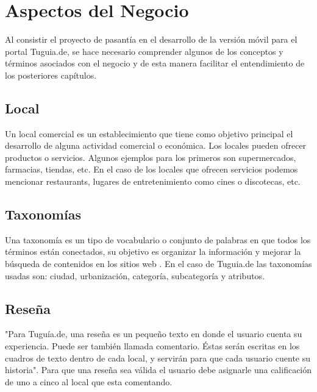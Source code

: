 \section{Aspectos del Negocio} \label{sect:aspectos_negocio}
  
Al consistir el proyecto de pasantía en el desarrollo de la versión móvil para el portal Tuguia.de, se hace necesario comprender algunos de los conceptos y términos asociados con el negocio y de esta manera facilitar el entendimiento de los posteriores capítulos.

\subsection{Local} \label{subsect:local}

Un local comercial es un establecimiento que tiene como objetivo principal el desarrollo de alguna actividad comercial o económica. Los locales pueden ofrecer productos o servicios. Algunos ejemplos para los primeros son supermercados, farmacias, tiendas, etc. En el caso de los locales que ofrecen servicios podemos mencionar restaurants, lugares de entretenimiento como cines o discotecas, etc.\cite{DLC}


\subsection{Taxonomías} \label{subsect:taxonomia}

Una taxonomía es un tipo de vocabulario o conjunto de palabras en que todos los términos están conectados, su objetivo es organizar la información y mejorar la búsqueda de contenidos en los sitios web \cite{CM05}. En el caso de Tuguia.de las taxonomías usadas son: 
ciudad, urbanización, categoría, subcategoría y atributos.

\subsection{Reseña} \label{subsect:resena}

"Para Tuguía.de, una reseña es un pequeño texto en donde el usuario cuenta su experiencia.  Puede ser también llamada comentario. Éstas serán escritas en los cuadros de texto dentro de cada local, y servirán para que cada usuario cuente su historia"\cite{TGD}. Para que una reseña sea válida el usuario debe asignarle una calificación de uno a cinco al local que esta comentando.

 


